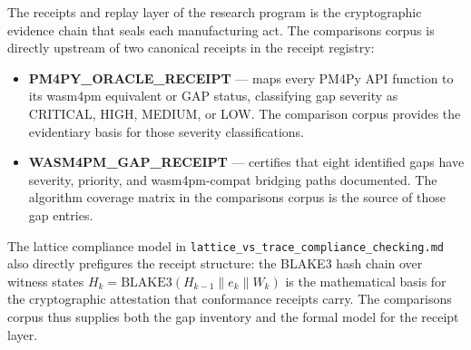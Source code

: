 The receipts and replay layer of the research program is the cryptographic
evidence chain that seals each manufacturing act. The comparisons corpus is
directly upstream of two canonical receipts in the receipt registry:

\begin{itemize}
  \item \textbf{PM4PY\_ORACLE\_RECEIPT} --- maps every PM4Py API function to its
    wasm4pm equivalent or GAP status, classifying gap severity as CRITICAL, HIGH,
    MEDIUM, or LOW. The comparison corpus provides the evidentiary basis for
    those severity classifications.
  \item \textbf{WASM4PM\_GAP\_RECEIPT} --- certifies that eight identified gaps
    have severity, priority, and wasm4pm-compat bridging paths documented. The
    algorithm coverage matrix in the comparisons corpus is the source of those
    gap entries.
\end{itemize}

The lattice compliance model in \texttt{lattice\_vs\_trace\_compliance\_checking.md}
also directly prefigures the receipt structure: the BLAKE3 hash chain over witness
states $H_k = \text{BLAKE3}(H_{k-1} \| e_k \| W_k)$ is the mathematical basis
for the cryptographic attestation that conformance receipts carry. The
comparisons corpus thus supplies both the gap inventory and the formal model for
the receipt layer.
